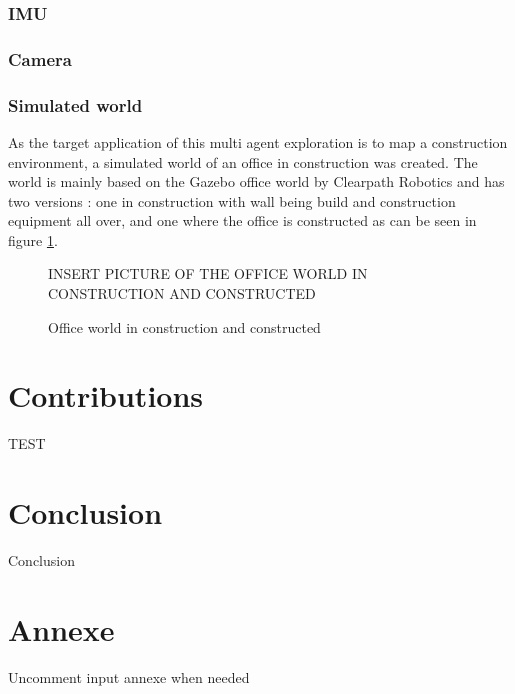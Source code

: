 \documentclass[11pt]{article}
\begin{document}
        \subsubsection{IMU}
        \subsubsection{Camera}
    \subsubsection{Simulated world}

    As the target application of this multi agent exploration is to map a construction environment, a simulated world of an office in construction was created. The world is mainly based on the Gazebo office world by Clearpath Robotics and has two versions : one in construction with wall being build and construction equipment all over, and one where the office is constructed as can be seen in figure \ref{fig:office_world}.

    \begin{figure}
        \centering
        \color{red} INSERT PICTURE OF THE OFFICE WORLD IN CONSTRUCTION AND CONSTRUCTED
        \caption{Office world in construction and constructed}
        \label{fig:office_world}
    \end{figure}

\section{Contributions}



    TEST \cite{zhang2020falco}

\section{Conclusion}

    Conclusion     

\newpage

\newpage
{}
\printnoidxglossaries %

\newpage
{}
\listoffigures


\newpage
\section*{Annexe}
Uncomment input annexe when needed
%



    
\end{document}
